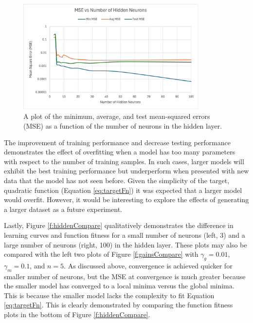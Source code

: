 \documentclass[11pt,pdftex,portrait,letterpaper]{article}
\begin{document}
\begin{figure}[!h]
    \centering
    \includegraphics[width=0.85\textwidth]{./figures/mse_v_neurons}
    \caption{A plot of the minimum, average, and test mean-squared errors (MSE) as a function of the number of neurons in the hidden layer.}
    \label{fig:mse_v_neurons}
\end{figure}

The improvement of training performance and decrease testing performance demonstrates the effect of overfitting when a model has too many parameters with respect to the number of training samples. In such cases, larger models will exhibit the best training performance but underperform when presented with new data that the model has not seen before. Given the simplicity of the target, quadratic function (Equation \ref{eq:targetFn}) it was expected that a larger model would overfit. However,  it would be interesting to explore the effects of generating a larger dataset as a future experiment.

Lastly, Figure \ref{f:hiddenCompare} qualitatively demonstrates the difference in learning curves and function fitness for a small number of neurons (left, 3) and a large number of neurons (right, 100) in the hidden layer. These plots may also be compared with the left two plots of Figure \ref{f:gainsCompare} with $\gamma_g=0.01$, $\gamma_m=0.1$, and $n=5$. As discussed above, convergence is achieved quicker for smaller number of neurons, but the MSE at convergence is much greater because the smaller model has converged to a local minima versus the global minima. This is because the smaller model lacks the complexity to fit Equation \ref{eq:targetFn}. This is clearly demonstrated by comparing the function fitness plots in the bottom of Figure \ref{f:hiddenCompare}.
\end{document}
